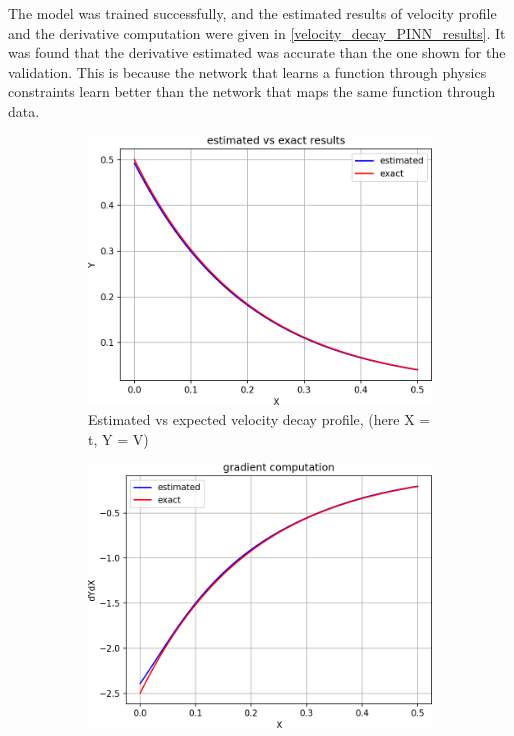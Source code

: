 \par{}
The model was trained successfully, and the estimated results of velocity
profile and the derivative computation were given in
\cref{velocity_decay_PINN_results}.  It was found that the derivative estimated
was accurate than the one shown for the validation. This is because the network
that learns a function through physics constraints learn better than the
network that maps the same function through data. \\

\begin{figure}
    \begin{subfigure}{0.5\linewidth}
       \center
        \includegraphics[scale=0.5]{supportingFiles/02_results/05_velocity_decay/estimated_output.png}
        \caption{Estimated vs expected velocity decay profile, (here X = t, Y = V)}
        \label{}
    \end{subfigure}
    \hfill
    \begin{subfigure}{0.5\linewidth}
       \center
        \includegraphics[scale=0.5]{supportingFiles/02_results/05_velocity_decay/gradient_computation.png}

\end{subfigure}
\end{figure}

